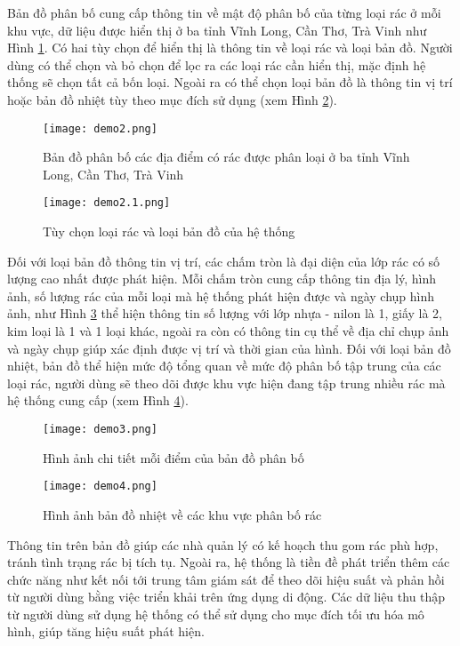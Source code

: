 \documentclass[../the.tex]{subfiles}
\begin{document}
{\fontsize{13}{12} \selectfont 

Bản đồ phân bố cung cấp thông tin về mật độ phân bố của từng loại rác ở mỗi khu vực, dữ liệu được hiển thị ở ba tỉnh Vĩnh Long, Cần Thơ, Trà Vinh như Hình \ref{fig:demo2}. 
Có hai tùy chọn để hiển thị là thông tin về loại rác và loại bản đồ. Người dùng có thể chọn và bỏ chọn để lọc ra các loại rác cần hiển thị, mặc định hệ thống sẽ chọn tất cả bốn loại. 
Ngoài ra có thể chọn loại bản đồ là thông tin vị trí hoặc bản đồ nhiệt tùy theo mục đích sử dụng (xem Hình \ref{fig:demo2.1}).

}

\begin{figure}[H]
    \centering
    \texttt{[image: demo2.png]}
    \caption{Bản đồ phân bố các địa điểm có rác được phân loại ở ba tỉnh Vĩnh Long, Cần Thơ, Trà Vinh}
    \label{fig:demo2}
\end{figure}


\begin{figure}[H]
    \centering
    \texttt{[image: demo2.1.png]}
    \caption{Tùy chọn loại rác và loại bản đồ của hệ thống}
    \label{fig:demo2.1}
\end{figure}

{\fontsize{13}{12} \selectfont 

Đối với loại bản đồ thông tin vị trí, các chấm tròn là đại diện của lớp rác có số lượng cao nhất được phát hiện. Mỗi chấm tròn cung cấp thông tin địa lý, hình ảnh, số lượng rác của mỗi loại mà hệ thống phát hiện được và ngày chụp hình ảnh, 
như Hình \ref{fig:demo3} thể hiện thông tin số lượng với lớp nhựa - nilon là 1, giấy là 2, kim loại là 1 và 1 loại khác, ngoài ra còn có thông tin cụ thể về địa chỉ chụp ảnh và ngày chụp giúp xác định được vị trí và thời gian của hình.
Đối với loại bản đồ nhiệt, bản đồ thể hiện mức độ tổng quan về mức độ phân bố tập trung của các loại rác, người dùng sẽ theo dõi được khu vực hiện đang tập trung nhiều rác mà hệ thống cung cấp (xem Hình \ref{fig:demo4}).
}

\begin{figure}[H]
    \centering
    \texttt{[image: demo3.png]}
    \caption{Hình ảnh chi tiết mỗi điểm của bản đồ phân bố}
    \label{fig:demo3}
\end{figure}


\begin{figure}[H]
    \centering
    \texttt{[image: demo4.png]}
    \caption{Hình ảnh bản đồ nhiệt về các khu vực phân bố rác}
    \label{fig:demo4}
\end{figure}

{\fontsize{13}{12} \selectfont 
Thông tin trên bản đồ giúp các nhà quản lý có kế hoạch thu gom rác phù hợp, tránh tình trạng rác bị tích tụ. 
Ngoài ra, hệ thống là tiền đề phát triển thêm các chức năng như kết nối tới trung tâm giám sát để theo dõi hiệu suất và phản hồi từ người dùng bằng việc triển khải trên ứng dụng di động.
Các dữ liệu thu thập từ người dùng sử dụng hệ thống có thể sử dụng cho mục đích tối ưu hóa mô hình, giúp tăng hiệu suất phát hiện. 

}
\end{document}
